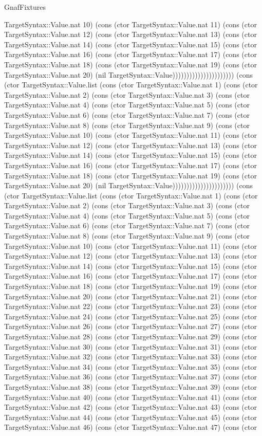 \begin{lexlean}{GnafFixtures}
\begin{semanticmodule}
{TargetSyntax::Value.nat 10) (cons (ctor TargetSyntax::Value.nat 11) (cons (ctor TargetSyntax::Value.nat 12) (cons (ctor TargetSyntax::Value.nat 13) (cons (ctor TargetSyntax::Value.nat 14) (cons (ctor TargetSyntax::Value.nat 15) (cons (ctor TargetSyntax::Value.nat 16) (cons (ctor TargetSyntax::Value.nat 17) (cons (ctor TargetSyntax::Value.nat 18) (cons (ctor TargetSyntax::Value.nat 19) (cons (ctor TargetSyntax::Value.nat 20) (nil TargetSyntax::Value)))))))))))))))))))))) (cons (ctor TargetSyntax::Value.list (cons (ctor TargetSyntax::Value.nat 1) (cons (ctor TargetSyntax::Value.nat 2) (cons (ctor TargetSyntax::Value.nat 3) (cons (ctor TargetSyntax::Value.nat 4) (cons (ctor TargetSyntax::Value.nat 5) (cons (ctor TargetSyntax::Value.nat 6) (cons (ctor TargetSyntax::Value.nat 7) (cons (ctor TargetSyntax::Value.nat 8) (cons (ctor TargetSyntax::Value.nat 9) (cons (ctor TargetSyntax::Value.nat 10) (cons (ctor TargetSyntax::Value.nat 11) (cons (ctor TargetSyntax::Value.nat 12) (cons (ctor TargetSyntax::Value.nat 13) (cons (ctor TargetSyntax::Value.nat 14) (cons (ctor TargetSyntax::Value.nat 15) (cons (ctor TargetSyntax::Value.nat 16) (cons (ctor TargetSyntax::Value.nat 17) (cons (ctor TargetSyntax::Value.nat 18) (cons (ctor TargetSyntax::Value.nat 19) (cons (ctor TargetSyntax::Value.nat 20) (nil TargetSyntax::Value)))))))))))))))))))))) (cons (ctor TargetSyntax::Value.list (cons (ctor TargetSyntax::Value.nat 1) (cons (ctor TargetSyntax::Value.nat 2) (cons (ctor TargetSyntax::Value.nat 3) (cons (ctor TargetSyntax::Value.nat 4) (cons (ctor TargetSyntax::Value.nat 5) (cons (ctor TargetSyntax::Value.nat 6) (cons (ctor TargetSyntax::Value.nat 7) (cons (ctor TargetSyntax::Value.nat 8) (cons (ctor TargetSyntax::Value.nat 9) (cons (ctor TargetSyntax::Value.nat 10) (cons (ctor TargetSyntax::Value.nat 11) (cons (ctor TargetSyntax::Value.nat 12) (cons (ctor TargetSyntax::Value.nat 13) (cons (ctor TargetSyntax::Value.nat 14) (cons (ctor TargetSyntax::Value.nat 15) (cons (ctor TargetSyntax::Value.nat 16) (cons (ctor TargetSyntax::Value.nat 17) (cons (ctor TargetSyntax::Value.nat 18) (cons (ctor TargetSyntax::Value.nat 19) (cons (ctor TargetSyntax::Value.nat 20) (cons (ctor TargetSyntax::Value.nat 21) (cons (ctor TargetSyntax::Value.nat 22) (cons (ctor TargetSyntax::Value.nat 23) (cons (ctor TargetSyntax::Value.nat 24) (cons (ctor TargetSyntax::Value.nat 25) (cons (ctor TargetSyntax::Value.nat 26) (cons (ctor TargetSyntax::Value.nat 27) (cons (ctor TargetSyntax::Value.nat 28) (cons (ctor TargetSyntax::Value.nat 29) (cons (ctor TargetSyntax::Value.nat 30) (cons (ctor TargetSyntax::Value.nat 31) (cons (ctor TargetSyntax::Value.nat 32) (cons (ctor TargetSyntax::Value.nat 33) (cons (ctor TargetSyntax::Value.nat 34) (cons (ctor TargetSyntax::Value.nat 35) (cons (ctor TargetSyntax::Value.nat 36) (cons (ctor TargetSyntax::Value.nat 37) (cons (ctor TargetSyntax::Value.nat 38) (cons (ctor TargetSyntax::Value.nat 39) (cons (ctor TargetSyntax::Value.nat 40) (cons (ctor TargetSyntax::Value.nat 41) (cons (ctor TargetSyntax::Value.nat 42) (cons (ctor TargetSyntax::Value.nat 43) (cons (ctor TargetSyntax::Value.nat 44) (cons (ctor TargetSyntax::Value.nat 45) (cons (ctor TargetSyntax::Value.nat 46) (cons (ctor TargetSyntax::Value.nat 47) (cons (ctor }
\end{semanticmodule}
\end{lexlean}
